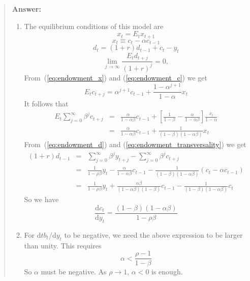 \begin{exercise} 
\begin{quote}
{\bf Answer:}
\begin{enumerate}
\item  The equilibrium conditions of this model are
\begin{equation}
\label{eq:endowment_x}
x_t = E_t x_{t+1}
\end{equation}
\begin{equation}
\label{eq:endowment_c}
x_t \equiv c_t - \alpha c_{t-1}
\end{equation}
\begin{equation}
\label{eq:endowment_d}
d_t = (1+r) d_{t-1} + c_t -y_t
\end{equation}
\begin{equation}
\label{eq:endowment_transversality}
\lim_{j\rightarrow \infty} \frac{E_td_{t+j}}{(1+r)^j} = 0,
\end{equation}
From~(\ref{eq:endowment_x}) and (\ref{eq:endowment_c}) we get
\[
E_t c_{t+j} = \alpha^{j+1} c_{t-1} + \frac{1-\alpha^{j+1}}{1-\alpha} x_t
\]
It follows that 
\begin{eqnarray*}
E_t \sum_{j=0}^{\infty} \beta^j
c_{t+j} 
&=& \frac{\alpha}{1-\alpha \beta} c_{t-1}
+ 
\left[
\frac{1}{1-\beta}
-
\frac{\alpha}{1-\alpha\beta}
\right]
\frac{x_t}{1-\alpha}
\\
&=&
\frac{\alpha}{1-\alpha\beta} c_{t-1}
+ 
\frac{1}{(1-\beta)(1-\alpha\beta)}
x_t
\end{eqnarray*}
From~(\ref{eq:endowment_d}) and (\ref{eq:endowment_transversality}) we get
\begin{eqnarray*}
(1+r)d_{t-1} 
&=& \sum_{j=0}^{\infty}
\beta^j y_{t+j}
-
\sum_{j=0}^{\infty}
\beta^j c_{t+j}
\\
&=&
\frac{1}{1-\rho \beta} y_t
- \frac{\alpha}{1-\alpha \beta} c_{t-1}
- 
\frac{1}{(1-\beta)(1-\alpha\beta)}(
c_t-\alpha c_{t-1})
\\
&=&
\frac{1}{1-\rho \beta} y_t
+ \frac{\alpha\beta}{(1-\alpha \beta)(1-\beta)} c_{t-1}
- 
\frac{1}{(1-\beta)(1-\alpha\beta)} 
c_t
\end{eqnarray*}
So we have
\[
\frac{\mbox{d}c_t}{\mbox{d}y_t}
=\frac{(1-\beta)(1-\alpha\beta)}{1-\rho\beta}
\]


\item For d$tb_t$/d$y_t$ to be negative, we need the above expression to be larger than unity. This requires
\[
\alpha < \frac{\rho-1}{1-\beta}
\]
So $\alpha$ must be negative. As $\rho\rightarrow 1$, $\alpha<0$ is enough. 
\end{enumerate}

\end{quote}
\end{exercise}

